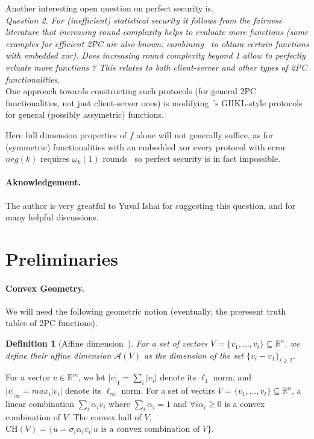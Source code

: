 \documentclass[a4paper]{article}
\newtheorem{definition}{Definition}[section]
\newcommand{\R}{\mathbb{R}}
\newcommand{\affine}[1]{\mathcal{A}(#1)}
\newcommand{\CH}[1]{\text{CH}(#1)}
\begin{document}

Another interesting open question on perfect security is.\\ 

\emph{Question 2. For (inefficient) statistical security it follows from the fairness literature that increasing round complexity helps to evaluate more functions (some examples for efficient 2PC are also known: combining~\cite{Ash14,GHKL08} to obtain certain functions with embedded xor).
Does increasing round complexity beyond 1 allow to perfectly evluate more functions ? This relates to both client-server and other types of 2PC functionalities.} \\

One approach towards constructing such protocols (for general 2PC functionalities, not just client-server ones) is modifying~\cite{Ash14}'s GHKL-style protocols for general (possibly assymetric) functions. 

Here full dimension properties of $f$ alone will not generally suffice, as for (symmetric) functionalities with an embedded xor every protocol with error $neg(k)$ requires $\omega_k(1)$ rounds~\cite{GHKL08} so perfect security is in fact impossible.

\paragraph{Aknowledgement.}

The author is very greatful to Yuval Ishai for suggesting this question, and for many helpful discussions. 

\section{Preliminaries}

\paragraph{Convex Geometry.} We will need the following geometric notion (eventually, the preresent truth tables of 2PC functions).
\begin{definition}[Affine dimension~\cite{Ash14}]
	For a set of vectors $V=\{v_1,\ldots,v_t\}\subseteq\R^n$, we define their affine dimension $\affine{V}$ as the dimension of the set
	$\{v_i-v_1\}_{i\geq 2}$. 
\end{definition}
For a vector $v\in \R^m$, 
we let $|v|_1=\sum_i|v_i|$ denote its $\ell_1$ norm, and $|v|_\infty=max_i |v_i|$ denote its $\ell_\infty$ norm.
For a set of vectirs $V=\{v_1,\ldots,v_t\}\subseteq\R^n$, a linear combination $\sum_i \alpha_iv_i$ where $\sum_i\alpha_i=1$ and $\forall i\alpha_i\geq 0$ is a convex combination of $V$. The convex hall of $V$,
$\CH{V}=\{u=\sigma_i\alpha_iv_i|u\text{ is a convex combination of }V\}$.
\end{document}
